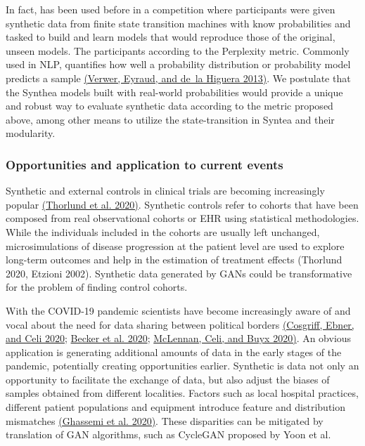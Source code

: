\documentclass[10pt]{article}
\begin{document}
In fact, has been used before in a competition where participants were given synthetic data from finite state transition machines with know probabilities and tasked to build and learn models that would reproduce those of the original, unseen models. The participants according to the Perplexity metric. Commonly used in NLP, quantifies how well a probability distribution or probability model predicts a sample \hyperref[csl:70]{(Verwer, Eyraud, and de~la Higuera 2013)}. We postulate that the Synthea models built with real-world probabilities would provide a unique and robust way to evaluate synthetic data according to the metric proposed above, among other means to utilize the state-transition in Syntea and their modularity.

\subsubsection{Opportunities and application to current events}
Synthetic and external controls in clinical trials are becoming increasingly popular \hyperref[csl:71]{(Thorlund et al. 2020)}. Synthetic controls refer to cohorts that have been composed from real observational cohorts or EHR using statistical methodologies. While the individuals included in the cohorts are usually left unchanged, microsimulations of disease progression at the patient level are used to explore long-term outcomes and help in the estimation of treatment effects (Thorlund 2020, Etzioni 2002). Synthetic data generated by GANs could be transformative for the problem of finding control cohorts.\par
With the COVID-19 pandemic scientists have become increasingly aware of and vocal about the need for data sharing between political borders \hyperref[csl:72]{(Cosgriff, Ebner, and Celi 2020}; \hyperref[csl:73]{Becker et al. 2020}; \hyperref[csl:74]{McLennan, Celi, and Buyx 2020)}. An obvious application is generating additional amounts of data in the early stages of the pandemic, potentially creating opportunities earlier. Synthetic is data not only an opportunity to facilitate the exchange of data, but also adjust the biases of samples obtained from different localities. Factors such as local hospital practices, different patient populations and equipment introduce feature and distribution mismatches \hyperref[csl:75]{(Ghassemi et al. 2020)}. These disparities can be mitigated by translation of GAN algorithms, such as CycleGAN proposed by Yoon et al.
\end{document}
